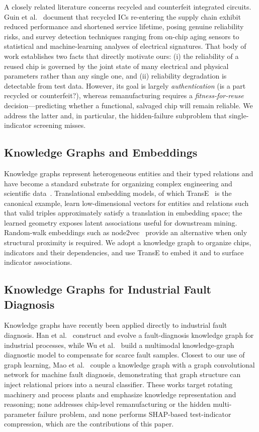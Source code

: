 \documentclass[electronics,article,submit,pdftex,moreauthors]{Definitions/mdpi}
\begin{document}
A closely related literature concerns recycled and counterfeit integrated circuits. Guin et al.~\cite{guin2014counterfeit} document that recycled ICs re-entering the supply chain exhibit reduced performance and shortened service lifetime, posing genuine reliability risks, and survey detection techniques ranging from on-chip aging sensors to statistical and machine-learning analyses of electrical signatures. That body of work establishes two facts that directly motivate ours: (i) the reliability of a reused chip is governed by the joint state of many electrical and physical parameters rather than any single one, and (ii) reliability degradation is detectable from test data. However, its goal is largely \emph{authentication} (is a part recycled or counterfeit?), whereas remanufacturing requires a \emph{fitness-for-reuse} decision---predicting whether a functional, salvaged chip will remain reliable. We address the latter and, in particular, the hidden-failure subproblem that single-indicator screening misses.

\subsection{Knowledge Graphs and Embeddings}
Knowledge graphs represent heterogeneous entities and their typed relations and have become a standard substrate for organizing complex engineering and scientific data~\cite{ji2022survey}. Translational embedding models, of which TransE~\cite{bordes2013translating} is the canonical example, learn low-dimensional vectors for entities and relations such that valid triples approximately satisfy a translation in embedding space; the learned geometry exposes latent associations useful for downstream mining. Random-walk embeddings such as node2vec~\cite{grover2016node2vec} provide an alternative when only structural proximity is required. We adopt a knowledge graph to organize chips, indicators and their dependencies, and use TransE to embed it and to surface indicator associations.

\subsection{Knowledge Graphs for Industrial Fault Diagnosis}
Knowledge graphs have recently been applied directly to industrial fault diagnosis. Han et al.~\cite{han2022kgevolution} construct and evolve a fault-diagnosis knowledge graph for industrial processes, while Wu et al.~\cite{wu2023mmkg} build a multimodal knowledge-graph diagnostic model to compensate for scarce fault samples. Closest to our use of graph learning, Mao et al.~\cite{mao2024gcnkg} couple a knowledge graph with a graph convolutional network for machine fault diagnosis, demonstrating that graph structure can inject relational priors into a neural classifier. These works target rotating machinery and process plants and emphasize knowledge representation and reasoning; none addresses chip-level remanufacturing or the hidden multi-parameter failure problem, and none performs SHAP-based test-indicator compression, which are the contributions of this paper.
\end{document}

